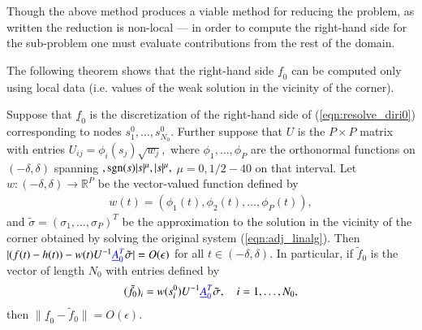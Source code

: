 \begin{remark}
Though the above method produces a viable method for reducing the problem, as written the reduction is non-local --- in order to compute the right-hand side for the sub-problem one must evaluate contributions from the rest of the domain.
\end{remark}

The following theorem shows that the right-hand side $\underline{f}_0$ can be computed only using local data (i.e. values of the weak solution in the vicinity of the corner).\\
\begin{theorem}
Suppose that $\underline{f}_0$ is the discretization of the right-hand side of (\ref{eqn:resolve_diri0}) corresponding to nodes $s^0_1,\dots,s^0_{N_0}.$ Further suppose that $U$ is the $P\times P$ matrix with entries $U_{ij} = \phi_i(s_j) \sqrt{w_j},$ where $\phi_1,\dots,\phi_P$ are the orthonormal functions on $(-\delta,\delta)$ spanning $,{\rm sgn}(s)|s|^\mu, |s|^\mu,$ $\mu=0,1/2-40$ on that interval. Let $w:(-\delta,\delta) \to \mathbb{R}^P$ be the vector-valued function defined by
\begin{align}
w(t) = (\phi_1(t),\phi_2(t),\dots,\phi_P(t)),
\end{align}
and $\tilde{\sigma} = (\sigma_1,\dots,\sigma_P)^T$ be the approximation to the solution in the vicinity of the corner obtained by solving the original system (\ref{eqn:adj_linalg}). Then $|(f(t)-h(t)) - w(t) U^{-1} {\color{blue} \underline{A}_0^T} \tilde{\sigma}| = O(\epsilon)$ for all $t \in(-\delta,\delta).$ In particular, if $\tilde{f}_0$ is the vector of length $N_0$ with entries defined by
\begin{align}
(\tilde{f}_0)_i = w(s^0_i) U^{-1} {\color{blue} \underline{A}_0^T} \tilde{\sigma}, \quad i=1,\dots,N_0,
\end{align}
then $\| \underline{f}_0 - \tilde{f}_0\| = O(\epsilon).$
\end{theorem}
